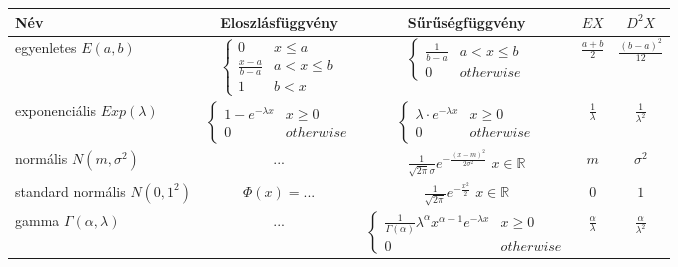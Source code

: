 \documentclass[margin=0px]{article}
\begin{document}
	\begin{tabular}{|p{3cm}|c|c|c|c|}
		\hline \textbf{Név} & \textbf{Eloszlásfüggvény} & \textbf{Sűrűségfüggvény} & \textbf{$EX$} & \textbf{$D^{2}X$} \\ 
		\hline egyenletes \newline $E(a,b)$ 
		& $\left\{\begin{array} {lr}
					0 & x \leq a \\
					\frac{x-a}{b-a} &  a < x \leq b \\
					1 & b < x 
			\end{array}\right.$
		& $\left\{\begin{array} {lr}
					\frac{1}{b-a} & a < x \leq b \\
					0 &  otherwise
			\end{array}\right.$
		& $\frac{a+b}{2}$
		& $\frac{(b-a)^2}{12}$ \\
		\hline exponenciális \newline $Exp(\lambda)$ 
		&  $\left\{\begin{array} {lr}
					1 - e^{-\lambda x} & x \geq 0 \\
					0 &  otherwise
			\end{array}\right.$
		&  $\left\{\begin{array} {lr}
					\lambda \cdot e^{-\lambda x} & x \geq 0 \\
					0 &  otherwise
			\end{array}\right.$
		& $\frac{1}{\lambda}$
		& $\frac{1}{\lambda^{2}}$ \\
		\hline normális \newline $N(m,\sigma^2)$ & $...$ & $\frac{1}{\sqrt{2 \pi}\sigma}e^{-\frac{(x-m)^2}{2\sigma^2}}$ $x \in \mathbb{R}$ & $m$ & $\sigma^2$ \\
		\hline standard normális \newline $N(0,1^2)$ & $\Phi(x)=...$ & $\frac{1}{\sqrt{2 \pi}}e^{-\frac{x^2}{2}}$ $x \in \mathbb{R}$ & $0$ & $1$ \\
		\hline gamma \newline $\Gamma(\alpha,\lambda)$ 
		& $...$ 
		& $\left\{\begin{array} {lr}
					\frac{1}{\Gamma(\alpha)}\lambda^{\alpha}x^{\alpha-1}e^{-\lambda x} & x \geq 0 \\
					0 &  otherwise
			\end{array}\right.$ 
		& $\frac{\alpha}{\lambda}$
		& $\frac{\alpha}{\lambda^2}$ \\
		\hline 
	\end{tabular}
	
\end{document}
